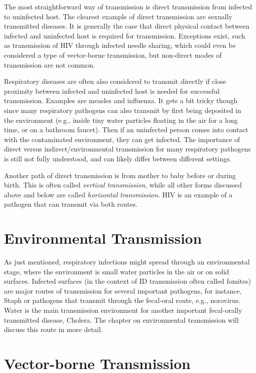 \documentclass[]{book}
\theoremstyle{definition}
\theoremstyle{definition}
\theoremstyle{definition}
\theoremstyle{remark}
\begin{document}
The most straightforward way of transmission is direct transmission from
infected to uninfected host. The clearest example of direct transmission
are sexually transmitted diseases. It is generally the case that direct
physical contact between infected and uninfected host is required for
transmission. Exceptions exist, such as transmission of HIV through
infected needle sharing, which could even be considered a type of
vector-borne transmission, but non-direct modes of transmission are not
common.

Respiratory diseases are often also considered to transmit directly if
close proximity between infected and uninfected host is needed for
successful transmission. Examples are measles and influenza. It gets a
bit tricky though since many respiratory pathogens can also transmit by
first being deposited in the environment (e.g., inside tiny water
particles floating in the air for a long time, or on a bathroom faucet).
Then if an uninfected person comes into contact with the contaminated
environment, they can get infected. The importance of direct versus
indirect/environmental transmission for many respiratory pathogens is
still not fully understood, and can likely differ between different
settings.

Another path of direct transmission is from mother to baby before or
during birth. This is often called \emph{vertical transmission}, while
all other forms discussed above and below are called \emph{horizontal
transmission}. HIV is an example of a pathogen that can transmit via
both routes.

\section{Environmental Transmission}\label{environmental-transmission}

As just mentioned, respiratory infections might spread through an
environmental stage, where the environment is small water particles in
the air or on solid surfaces. Infected surfaces (in the context of ID
transmission often called fomites) are major routes of transmission for
several important pathogens, for instance, Staph or pathogens that
transmit through the fecal-oral route, e.g., norovirus. Water is the
main transmission environment for another important fecal-orally
transmitted disease, Cholera. The chapter on environmental transmission
will discuss this route in more detail.

\section{Vector-borne Transmission}\label{vector-borne-transmission}
\end{document}
